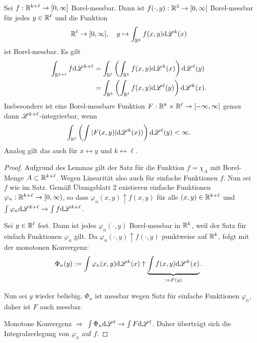 \begin{thm}[Tonelli]{}
 Sei $f: \mathbb{R}^{k+\ell} \to [0, \infty]$ Borel-messbar. Dann ist $f(\cdot,y):\mathbb{R}^3 \to [0,\infty]$ Borel-messbar für jedes $y \in \mathbb{R}^\ell$ und die Funktion
 \[ \mathbb{R}^\ell \to [0,\infty], \quad y \mapsto \int_{\mathbb{R}^k} f(x,y) \mathrm{d} \mathscr{L}^k (x) \]
 ist Borel-messbar. Es gilt
 \[ \begin{aligned} \int_{\mathbb{R}^{k+\ell}} f \mathrm{d} \mathscr{L}^{k+\ell} 
    &= \int_{\mathbb{R}^\ell} \left( \int_{\mathbb{R}^k} f(x,y) \mathrm{d} \mathscr{L}^k (x) \right) \mathrm{d} \mathscr{L}^\ell (y) \\
    &= \int_{\mathbb{R}^k} \left( \int_{\mathbb{R}^\ell} f(x,y) \mathrm{d} \mathscr{L}^\ell (y) \right) \mathrm{d} \mathscr{L}^k (x).
 \end{aligned} \]
 Insbesondere ist eine Borel-messbare Funktion $F: \mathbb{R}^k \times \mathbb{R}^\ell \to [-\infty, \infty]$ genau dann $\mathscr{L}^{k+\ell}$-integrierbar, wenn
 \[ \int_{\mathbb{R}^\ell} \left( \int |F(x,y)| \mathrm{d} \mathscr{L}^k (x) ) \right) \mathrm{d} \mathscr{L}^\ell (y) < \infty. \]
 Analog gilt das auch für $x \leftrightarrow y$ und $k \leftrightarrow \ell$.
\end{thm}

\begin{proof}
 Aufgrund des Lemmas gilt der Satz für die Funktion $f = \chi_A$ mit Borel-Menge $A \subset \mathbb{R}^{k+\ell}$. Wegen Linearität also auch für einfache Funktionen $f$. Nun sei $f$ wie im Satz. Gemäß Übungsblatt 2 existieren einfache Funktionen $\varphi_n : \mathbb{R}^{k+\ell} \to [0, \infty)$, so dass $\varphi_n (x,y) \uparrow f(x,y)$ für alle $(x,y) \in \mathbb{R}^{k+\ell}$ und $\int \varphi_n \mathrm{d} \mathscr{L}^{k+\ell} \rightarrow \int f \mathrm{d} \mathscr{L}^{k+\ell}$.
 
 Sei $y \in \mathbb{R}^\ell$ fest. Dann ist jedes $\varphi_n(\cdot, y)$ Borel-messbar in $\mathbb{R}^k$, weil der Satz für einfach Funktionen $\varphi_n$ gilt. Da $\varphi_n(\cdot, y) \uparrow f( \cdot, y)$ punktweise auf $\mathbb{R}^k$, folgt mit der monotonen Konvergenz:
 \[ \Phi_n(y) := \int \varphi_n(x,y) \mathrm{d} \mathscr{L}^k (x) \uparrow \underbrace{\int f(x,y) \mathrm{d} \mathscr{L}^k (x)}_{:= F(y)}. \]
 
 Nun sei $y$ wieder beliebig. $\Phi_n$ ist messbar wegen Satz für einfache Funktionen $\varphi_n$, daher ist $F$ auch messbar.
 
 Monotone Konvergenz $\Rightarrow$ $\int \Phi_n \mathrm{d} \mathscr{L}^\ell \rightarrow \int F \mathrm{d} \mathscr{L}^\ell$. Daher überträgt sich die Integralzerlegung von $\varphi_n$ auf $f$.
\end{proof}

